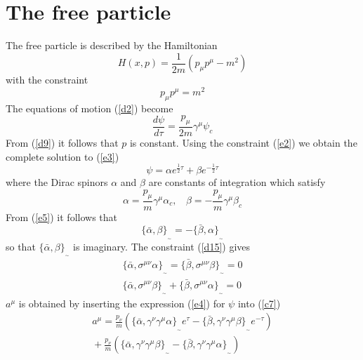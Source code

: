 \documentclass[a4paper,a4paper]{article}
\begin{document}
\section{The free particle}
The free particle is described by the Hamiltonian
\begin{equation} 
H(x,p)=\frac{1}{2m}\left(p_{\mu }p^{\mu }- m^{2}\right)
\label{e1}
\end{equation}
with the constraint 
\begin{equation}
p_{\mu }p^{\mu }= m^{2}
\label{e2}
\end{equation}
The equations of motion (\ref{d2}) become
\begin{equation}
\frac{d\psi}{d\tau} = \frac{p_{\mu }}{2m}\gamma ^{\mu } \psi _{c} 
\label{e3}
\end{equation}
From (\ref{d9}) it follows that $p$ is constant. Using the constraint
(\ref{e2}) we obtain the complete solution to (\ref{e3}) 
\begin{equation}
\psi = \alpha e^{\frac{1}{2}\tau } + \beta e^{-\frac{1}{2}\tau }
\label{e4}
\end{equation}
where the Dirac spinors $\alpha $ and $\beta $ are constants of integration
which satisfy
\begin{equation}
\alpha = \frac{p_{\mu }}{m}\gamma ^{\mu }\alpha  _{c}, \ \ \ \ \beta  = -
\frac{p_{\mu }}{m}\gamma ^{\mu }\beta  _{c}
\label{e5}
\end{equation}
From (\ref{e5}) it follows that
\begin{equation}
\{\bar{\alpha },\beta \}_{_{\sim }} = -\{\bar{\beta  },\alpha  \}_{_{\sim }}
\label{e6}
\end{equation}
so that $\{\bar{\alpha },\beta \}_{_{\sim }}$ is imaginary. The constraint
(\ref{d15}) gives 
\begin{eqnarray}
\{\bar{\alpha },\sigma ^{\mu \nu }\alpha \}_{_{\sim }} = \{\bar{\beta  },\sigma
^{\mu \nu}\beta  \}_{_{\sim }} = 0
\label{e7}
\\
\{\bar{\alpha },\sigma ^{\mu \nu }\beta  \}_{_{\sim }} + \{\bar{\beta  },\sigma
^{\mu \nu}\alpha \}_{_{\sim }} = 0
\label{e8}
\end{eqnarray}
$a^{\mu}$ is obtained by inserting the expression (\ref{e4}) for $\psi $ into
(\ref{c7}) 
\begin{eqnarray}
a^{\mu}=
\frac{p_{\nu}}{m}\left(\{\bar{\alpha},\gamma^{\nu}\gamma^{\mu}\alpha\}_{_{\sim
}}e^{\tau } - \{\bar{\beta},\gamma^{\nu}\gamma^{\mu}\beta\}_{_{\sim}}e^{-
\tau}\right) \nonumber \\
 \mbox{}+ \frac{p_{\nu}}{m}\left(\{\bar{\alpha},\gamma^{\nu }\gamma^{\mu
}\beta\}_{_{\sim }}- 
 \{\bar{\beta},\gamma^{\nu }\gamma^{\mu }\alpha \}_{_{\sim }}\right) 
\label{e9}
\end{eqnarray}
\end{document}

